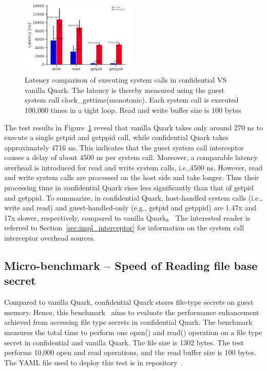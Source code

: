 \begin{figure}[!htb]
    \centering
    \includegraphics[width=0.5\textwidth]{images/ben_results_syscall_interceptor.PNG}
    \caption[Benchmark result of Syscall Interceptor]{Latency comparison of executing system calls in confidential VS vanilla Quark. The latency is thereby measured using the guest system call clock\_gettime(monotonic). 
        Each system call is executed 100,000  times in a tight loop. Read and write buffer size is 100 bytes}
    \label{fig:ben_results_syscall_interceptor}
\end{figure}

The test results in Figure~\ref{fig:ben_results_syscall_interceptor} reveal that vanilla Quark takes only around 270 ns to execute a single getpid and getppid call, while confidential Quark takes approximately 4716 ns. This indicates that the guest system call interceptor causes a delay of about 4500 ns per system call. Moreover, a 
comparable latency overhead is introduced for read and write system calls, i.e.,4500 ns. However, read and write system calls are processed on the host side and take longer. Thus their processing time in confidential Quark rises less significantly than that of getpid and getppid. To summarize, in 
confidential Quark, host-handled system calls (i.e., write and read) and guest-handled-only (e.g., getpid and getppid) are 1.47x and 17x slower, respectively, compared to vanilla Quark。 The interested reader is referred to Section~\ref*{sec:impl_interceptor} for information on the system call 
interceptor overhead sources.

\subsection{Micro-benchmark – Speed of Reading file base secret}\label{bench_reading_file_secret}

Compared to vanilla Quark, confidential Quark stores file-type secrets on guest memory. Hence, this benchmark~\cite*{benchamark_filebase_secret}  aims to evaluate the performance enhancement achieved from accessing file type secrets in confidential Quark. 
The benchmark measures the total time to perform one open() and read() operation on a file type secret in confidential and vanilla Quark. The file size is 1302 bytes. The test performs 10,000 open and read operations, and the read buffer size is 100 bytes. The YAML file used to deploy this test 
is in repository~\cite*{perf_test_repo}.


